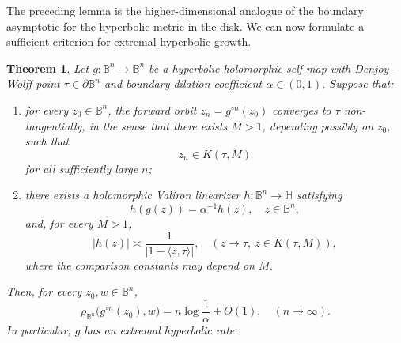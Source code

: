 \documentclass[10pt,a4paper]{amsart}
\numberwithin{equation}{section}
\newtheorem{theorem}[equation]{Theorem}
\begin{document}
The preceding lemma is the higher-dimensional analogue of the boundary
asymptotic for the hyperbolic metric in the disk. We can now formulate a
sufficient criterion for extremal hyperbolic growth.


\begin{theorem}
\label{thm:ball}
Let
$g:\mathbb B^n\to\mathbb B^n$ be a hyperbolic holomorphic self-map with
Denjoy--Wolff point $\tau\in\partial\mathbb B^n$ and boundary dilation
coefficient $\alpha\in(0,1)$. Suppose that:

\begin{enumerate}
\item[\emph{(a)}]
for every $z_0\in\mathbb B^n$, the forward orbit
$z_n=g^{\circ n}(z_0)$ converges to $\tau$ non-tangentially, in the sense
that there exists $M>1$, depending possibly on $z_0$, such that
\begin{equation*}
z_n\in K(\tau,M)
\end{equation*}
for all sufficiently large $n$;

\item[\emph{(b)}]
there exists a holomorphic Valiron linearizer
$h:\mathbb B^n\to\mathbb H$ satisfying
\begin{equation}
\label{eq:ball_valiron}
h(g(z))
=
\alpha^{-1}h(z),
\quad z\in\mathbb B^n,
\end{equation}
and, for every $M>1$,
\begin{equation}
\label{eq:ball_nondegenerate}
|h(z)|
\asymp
\frac{1}{|1-\langle z,\tau\rangle|},
\quad
(z\to\tau,\ z\in K(\tau,M)),
\end{equation}
where the comparison constants may depend on $M$.
\end{enumerate}

Then, for every $z_0,w\in\mathbb B^n$,
\begin{equation*}
\label{eq:ball_extremal_rate}
\rho_{\mathbb B^n}
\bigl(g^{\circ n}(z_0),w\bigr)
=
n\log\frac1\alpha
+
O(1),
\quad
(n\to\infty).
\end{equation*}
In particular, $g$ has an extremal hyperbolic rate.
\end{theorem}
\end{document}
